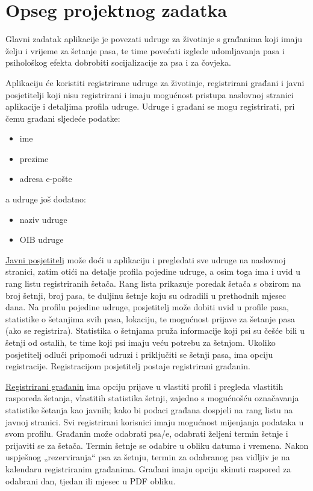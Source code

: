 	\section{Opseg projektnog zadatka}
	  \vspace{15pt}
		Glavni zadatak aplikacije je povezati udruge za životinje s građanima koji imaju
	želju i vrijeme za šetanje pasa, te time povećati izglede udomljavanja pasa i psihološkog
	efekta dobrobiti socijalizacije za psa i za čovjeka. \par \vspace{10pt}
	Aplikaciju će koristiti registrirane udruge za životinje, registrirani
	građani i javni posjetitelji koji nisu registrirani i imaju mogućnost
	pristupa naslovnoj stranici aplikacije i detaljima profila udruge.
	Udruge i građani se mogu registrirati, pri čemu građani sljedeće podatke:
	\begin{itemize}
		\item ime
		\item prezime
		\item adresa e-pošte
	\end{itemize} 
	a udruge još dodatno:
	\begin{itemize}
		\item naziv udruge
		\item OIB udruge
	\end{itemize}
	 \vspace{10pt}
	\underline{Javni posjetitelj} može doći u aplikaciju i
	pregledati sve udruge na naslovnoj stranici, zatim otići na detalje profila pojedine udruge,
	a osim toga ima i uvid u rang listu registriranih šetača.  Rang lista prikazuje poredak šetača
	s obzirom na broj šetnji, broj pasa, te duljinu šetnje koju su odradili u prethodnih mjesec
	dana.
	Na profilu pojedine udruge, posjetitelj može dobiti uvid u profile pasa,
	statistike o šetanjima svih pasa, lokaciju, te mogućnost prijave za šetanje pasa (ako se registrira). Statistika
	o šetnjama pruža informacije koji psi su češće bili u šetnji od ostalih, te time koji psi imaju
	veću potrebu za šetnjom.
	Ukoliko posjetitelj odluči pripomoći udruzi i priključiti se šetnji
	pasa, ima opciju registracije. Registracijom posjetitelj postaje registrirani građanin. 
	
	
	  \vspace{15pt} \par 
	  
	  	\underline{Registrirani građanin} ima opciju prijave u vlastiti profil i pregleda vlastitih rasporeda šetanja,
	  vlastitih statistika šetnji, zajedno s mogućnošću označavanja statistike šetanja kao javnih;
	  kako bi podaci građana dospjeli na rang listu na javnoj stranici.
	  Svi registrirani korisnici imaju mogućnost mijenjanja podataka u svom profilu.
	   Građanin može odabrati psa/e, odabrati željeni
	  termin šetnje i prijaviti se za šetača. Termin šetnje se odabire u obliku datuma i vremena.
	  Nakon uspješnog „rezerviranja“ psa za šetnju, termin za odabranog psa vidljiv je na
	  kalendaru registriranim građanima. Građani imaju opciju skinuti 
	  raspored za odabrani dan, tjedan ili mjesec u PDF obliku.\par
	  \vspace{15pt}
	
